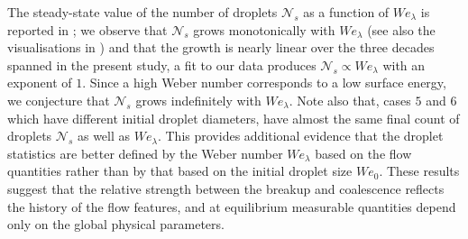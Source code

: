 The steady-state value of the number of droplets $\mathcal{N}_s$ as a function of $We_\lambda$ is reported in ; we observe that $\mathcal{N}_s$ grows monotonically with $We_\lambda$ (see also the visualisations in ) and that the growth is nearly linear over the three decades spanned in the present study, \ie a fit to our data produces $\mathcal{N}_s\propto We_\lambda$ with an exponent of $1$. Since a high Weber number corresponds to a low surface energy, we conjecture that $\mathcal{N}_s$ grows indefinitely with $We_\lambda$. Note also that, cases $5$ and $6$ which have different initial droplet diameters, have almost the same final count of droplets $\mathcal{N}_s$ as well as $We_\lambda$. This provides additional evidence that the droplet statistics are better defined by the Weber number $We_\lambda$ based on the flow quantities rather than by that based on the initial droplet size $We_0$. These results suggest that the relative strength between the breakup and coalescence reflects the history of the flow features, and at equilibrium measurable quantities depend only on the global physical parameters.

